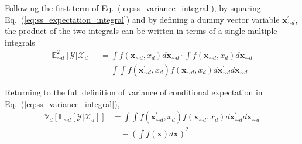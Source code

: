 Following the first term of Eq.~(\ref{eq:ss_variance_integral}),
by squaring Eq.~(\ref{eq:ss_expectation_integral})
and by defining a dummy vector variable $\bm{x}^{\prime}_{\sim d}$, 
the product of the two integrals can be written in terms of a single multiple integrals
\begin{equation}
  \begin{split}
    \mathbb{E}_{\sim d}^{2} [\mathcal{Y}|\mathcal{X}_d] & = \int f(\bm{x}_{\sim d}, x_d) d\bm{x}_{\sim d} \cdot \int f(\bm{x}_{\sim d}, x_d) d\bm{x}_{\sim d} \\
                                    & = \int \int f(\bm{x}^{\prime}_{\sim d}, x_d) f(\bm{x}_{\sim d}, x_d) d\bm{x}^{\prime}_{\sim d} d\bm{x}_{\sim d}
  \end{split}
\label{eq:ss_multiple_integrals}
\end{equation}

Returning to the full definition of variance of conditional expectation in Eq.~(\ref{eq:ss_variance_integral}),
\begin{equation}
  \begin{split}
    \mathbb{V}_{d}[\mathbb{E}_{\sim d}[\mathcal{Y}|\mathcal{X}_d]] & = \int \int f(\bm{x}^{\prime}_{\sim d}, x_d) f(\bm{x}_{\sim d}, x_d) d\bm{x}^{\prime}_{\sim d} d\bm{x}_{\sim d} \\
                                               & \quad - \left(\int f(\bm{x}) d\bm{x}\right)^2
  \end{split}
\label{eq:ss_variance_integral_single}
\end{equation}

